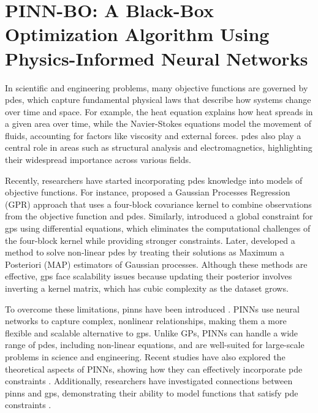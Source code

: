 \chapter{PINN-BO: A Black-Box Optimization
Algorithm Using Physics-Informed
Neural Networks} %

In scientific and engineering problems, many objective functions are governed by \acfp{pde}, which capture fundamental physical laws that describe how systems change over time and space. For example, the heat equation explains how heat spreads in a given area over time, while the Navier-Stokes equations model the movement of fluids, accounting for factors like viscosity and external forces. \acp{pde} also play a central role in areas such as structural analysis and electromagnetics, highlighting their widespread importance across various fields.

Recently, researchers have started incorporating \acp{pde} knowledge into models of objective functions. For instance, \citet{raissi2017machine} proposed a Gaussian Processes Regression (GPR) approach that uses a four-block covariance kernel to combine observations from the objective function and \acp{pde}. Similarly, \citet{jidling2017linearly} introduced a global constraint for \acfp{gp} using differential equations, which eliminates the computational challenges of the four-block kernel while providing stronger constraints. Later, \citet{chen2021solving} developed a method to solve non-linear \acp{pde} by treating their solutions as Maximum a Posteriori (MAP) estimators of Gaussian processes. Although these methods are effective, \acp{gp} face scalability issues because updating their posterior involves inverting a kernel matrix, which has cubic complexity as the dataset grows.

To overcome these limitations, \acfp{pinn} have been introduced \citep{raissi2019physics, yang2021b}. PINNs use neural networks to capture complex, nonlinear relationships, making them a more flexible and scalable alternative to \acp{gp}. Unlike GPs, PINNs can handle a wide range of \acp{pde}, including non-linear equations, and are well-suited for large-scale problems in science and engineering. Recent studies have also explored the theoretical aspects of PINNs, showing how they can effectively incorporate \ac{pde} constraints \citep{schiassi2021extreme, wangL2}. Additionally, researchers have investigated connections between \acp{pinn} and \acp{gp}, demonstrating their ability to model functions that satisfy \ac{pde} constraints \citep{wang2022and}.

